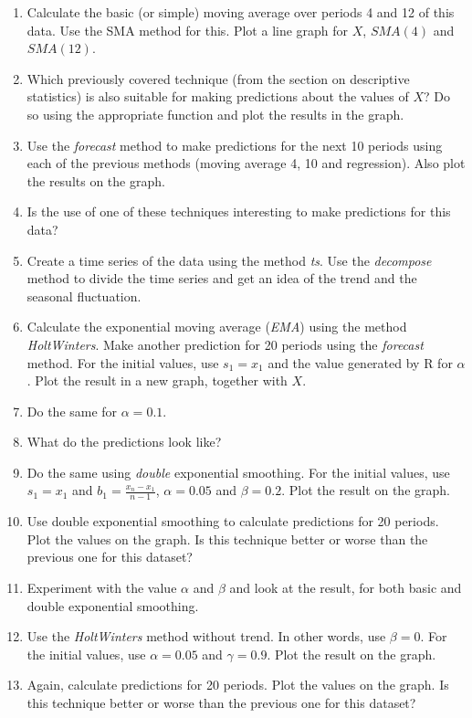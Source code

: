 \begin{exercise}
  \begin{enumerate}
    \item Calculate the basic (or simple) moving average over periods 4 and 12 of this data. Use the SMA method for this. Plot a line graph for $X$, $SMA(4)$ and $SMA(12)$.
    \item Which previously covered technique (from the section on descriptive statistics) is also suitable for making predictions about the values of $X$? Do so using the appropriate function and plot the results in the graph.
    \item Use the \emph{forecast} method to make predictions for the next 10 periods using each of the previous methods (moving average 4, 10 and regression). Also plot the results on the graph.
    \item Is the use of one of these techniques interesting to make predictions for this data?
    \item Create a time series of the data using the method \emph{ts}. Use the \emph{decompose} method to divide the time series and get an idea of the trend and the seasonal fluctuation.
    \item Calculate the exponential moving average (\emph{EMA}) using the method \emph{HoltWinters}. Make another prediction for 20 periods using the \emph{forecast} method. For the initial values, use $s_1 = x_1$ and the value generated by R for $\alpha$. Plot the result in a new graph, together with $X$.
    \item Do the same for $\alpha=0.1$.
    \item What do the predictions look like?
    \item Do the same using \emph{double} exponential smoothing. For the initial values, use $s_1 = x_1$ and $b_1 = \frac{x_n - x_1}{n - 1}$, $\alpha =  0.05$ and $\beta = 0.2$. Plot the result on the graph.
    \item Use double exponential smoothing to calculate predictions for 20 periods. Plot the values on the graph. Is this technique better or worse than the previous one for this dataset?
    \item Experiment with the value $\alpha$ and $\beta$ and look at the result, for both basic and double exponential smoothing.
    \item Use the \emph{HoltWinters} method without trend. In other words, use $\beta=0$. For the initial values, use $\alpha =  0.05$ and $\gamma = 0.9$. Plot the result on the graph.
    \item Again, calculate predictions for 20 periods. Plot the values on the graph. Is this technique better or worse than the previous one for this dataset?

\end{enumerate}
\end{exercise}
